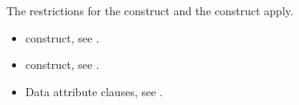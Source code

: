 \restrictions
The restrictions for the  construct and the  construct apply.

\crossreferences
\begin{itemize}
\item {} construct, see
.

\item {} construct, see
.

\item Data attribute clauses, see
.
\end{itemize}









